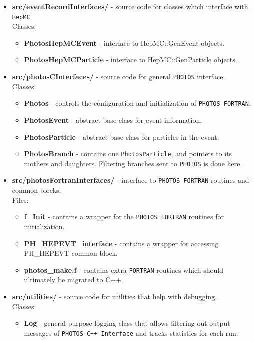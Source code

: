 \documentclass[]{Photos_interface_design}
\begin{document}
\begin{itemize}
\item {\bf src/eventRecordInterfaces/ } - source code for classes which interface with {\tt HepMC}.\\
  Classes:
  \begin{itemize}
  \item { \bf PhotosHepMCEvent} - interface to HepMC::GenEvent objects. 
  \item { \bf PhotosHepMCParticle} - interface to HepMC::GenParticle objects. 
  \end{itemize}   

\item {\bf src/photosCInterfaces/ } - source code for general {\tt PHOTOS} interface.  \\
  Classes:
  \begin{itemize}
  \item { \bf Photos } - controls the configuration and initialization of {\tt PHOTOS FORTRAN}.
  \item { \bf PhotosEvent } - abstract base class for event information.
  \item { \bf PhotosParticle } - abstract base class for particles in the event.
  \item { \bf PhotosBranch } - contains one {\tt PhotosParticle}, and  pointers to its mothers and daughters.
  Filtering branches sent to {\tt PHOTOS} is done here.
  \end{itemize}

\item {\bf src/photosFortranInterfaces/ } -  interface to {\tt PHOTOS FORTRAN} routines and common blocks. \\
  Files:
    \begin{itemize}
    \item { \bf f\_Init } - contains a wrapper for the {\tt PHOTOS FORTRAN} routines for initialization.
    \item { \bf PH\_HEPEVT\_interface } - contains a wrapper for accessing PH\_HEPEVT common block.
    \item { \bf photos\_make.f } - contains extra {\tt FORTRAN} routines which should ultimately be migrated to C++.
    \end{itemize}

\item {\bf src/utilities/ } - source code for utilities that help with debugging.\\
  Classes:
  \begin{itemize}
  \item { \bf Log} - general purpose logging class that allows filtering out output messages 
      of {\tt PHOTOS C++ Interface} and tracks statistics for each run.
  \end{itemize}   


\end{itemize}
\end{document}

